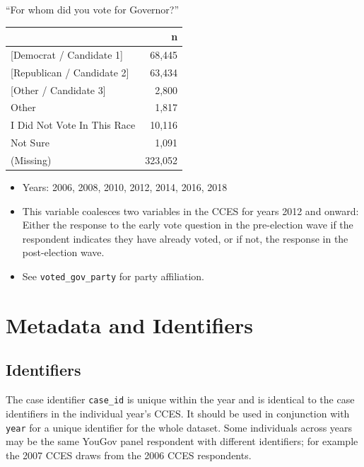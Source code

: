 \documentclass[10pt,article,oneside]{memoir}
\theoremstyle{definition}
\begin{document}
``For whom did you vote for Governor?''

\begin{table}[H]
\centering
\begin{tabular}{lr}
\toprule
 & n\\
\midrule
{[Democrat / Candidate 1]} & 68,445\\
{[Republican / Candidate 2]} & 63,434\\
{[Other / Candidate 3]} & 2,800\\
Other & 1,817\\
I Did Not Vote In This Race & 10,116\\
Not Sure & 1,091\\
(Missing) & 323,052\\
\bottomrule
\end{tabular}
\end{table}

\begin{itemize}
\tightlist
\item
  Years: 2006, 2008, 2010, 2012, 2014, 2016, 2018
\item
  This variable coalesces two variables in the CCES for years 2012 and
  onward: Either the response to the early vote question in the
  pre-election wave if the respondent indicates they have already voted,
  or if not, the response in the post-election wave.
\item
  See \texttt{voted\_gov\_party} for party affiliation.
\end{itemize}

\newpage

\hypertarget{metadata-and-identifiers}{%
\section{Metadata and Identifiers}\label{metadata-and-identifiers}}

\hypertarget{identifiers}{%
\subsection{Identifiers}\label{identifiers}}

The case identifier \texttt{case\_id} is unique within the year and is
identical to the case identifiers in the individual year's CCES. It
should be used in conjunction with \texttt{year} for a unique identifier
for the whole dataset. Some individuals across years may be the same
YouGov panel respondent with different identifiers; for example the 2007
CCES draws from the 2006 CCES respondents.
\end{document}
